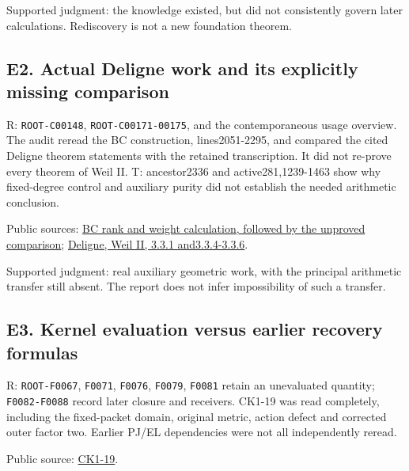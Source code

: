 \documentclass[
  british,
  11pt,
  a4paper,
]{article}
\begin{document}
Supported judgment: the knowledge existed, but did not consistently
govern later calculations. Rediscovery is not a new foundation theorem.

\subsection{E2. Actual Deligne work and its explicitly missing
comparison}\label{e2.-actual-deligne-work-and-its-explicitly-missing-comparison}

R: \texttt{ROOT-C00148}, \texttt{ROOT-C00171-00175}, and the
contemporaneous usage overview. The audit reread the BC construction,
lines2051-2295, and compared the cited Deligne theorem statements with
the retained transcription. It did not re-prove every theorem of Weil
II. T: ancestor2336 and active281,1239-1463 show why fixed-degree
control and auxiliary purity did not establish the needed arithmetic
conclusion.

Public sources:
\href{https://github.com/KokunoYumeto/zeta-function-research-reader/blob/e1dc06aa68bb810cf7d8b0006942f5b036b8b765/workbenches/splitzero-tandem/continuations/20260913-accepted-followups/deligne-mixed-control/COMPLETE_CONTROL_WORK.tex\#L2229}{BC
rank and weight calculation, followed by the unproved comparison};
\href{https://www.numdam.org/item/PMIHES_1980__52__137_0/}{Deligne, Weil
II, 3.3.1 and3.3.4-3.3.6}.

Supported judgment: real auxiliary geometric work, with the principal
arithmetic transfer still absent. The report does not infer
impossibility of such a transfer.

\subsection{E3. Kernel evaluation versus earlier recovery
formulas}\label{e3.-kernel-evaluation-versus-earlier-recovery-formulas}

R: \texttt{ROOT-F0067}, \texttt{F0071}, \texttt{F0076}, \texttt{F0079},
\texttt{F0081} retain an unevaluated quantity; \texttt{F0082-F0088}
record later closure and receivers. CK1-19 was read completely,
including the fixed-packet domain, original metric, action defect and
corrected outer factor two. Earlier PJ/EL dependencies were not all
independently reread.

Public source:
\href{https://github.com/KokunoYumeto/zeta-function-research-reader/blob/1447462732b40b1474bd9a819cf79257f5326ada/workbenches/splitzero-tandem/continuations/20260922-kernel-frequency/COMBINED_KERNEL_AND_RECEIVERS.md\#L148}{CK1-19}.
\end{document}
